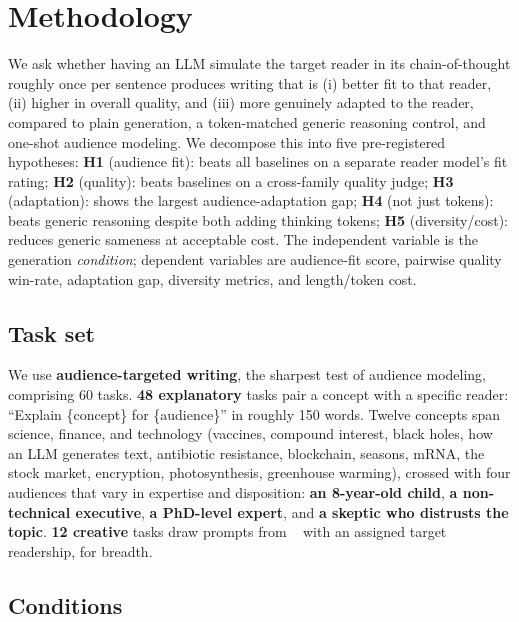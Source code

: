 \section{Methodology}
\label{sec:method}

 We ask whether having an LLM simulate the target reader
in its chain-of-thought roughly once per sentence produces writing that is (i) better fit to that
reader, (ii) higher in overall quality, and (iii) more genuinely adapted to the reader, compared
to plain generation, a token-matched generic reasoning control, and one-shot audience modeling. We
decompose this into five pre-registered hypotheses: \textbf{H1} (audience fit): \persentence
beats all baselines on a separate reader model's fit rating; \textbf{H2} (quality): \persentence
beats baselines on a cross-family quality judge; \textbf{H3} (adaptation): \persentence shows the
largest audience-adaptation gap; \textbf{H4} (not just tokens): \persentence beats generic
reasoning despite both adding thinking tokens; \textbf{H5} (diversity/cost): \persentence reduces
generic sameness at acceptable cost. The independent variable is the generation \emph{condition};
dependent variables are audience-fit score, pairwise quality win-rate, adaptation gap, diversity
metrics, and length/token cost.

\subsection{Task set}

We use \textbf{audience-targeted writing}, the sharpest test of audience modeling, comprising 60
tasks. \textbf{48 explanatory} tasks pair a concept with a specific reader: ``Explain
\{concept\} for \{audience\}'' in roughly 150 words. Twelve concepts span science, finance, and
technology (vaccines, compound interest, black holes, how an LLM generates text, antibiotic
resistance, blockchain, seasons, mRNA, the stock market, encryption, photosynthesis, greenhouse
warming), crossed with four audiences that vary in expertise and disposition: \textbf{an
8-year-old child}, \textbf{a non-technical executive}, \textbf{a PhD-level expert}, and \textbf{a
skeptic who distrusts the topic}. \textbf{12 creative} tasks draw prompts from
\writingprompts~\citep{fan2018writingprompts} with an assigned target readership, for breadth.

\subsection{Conditions}

